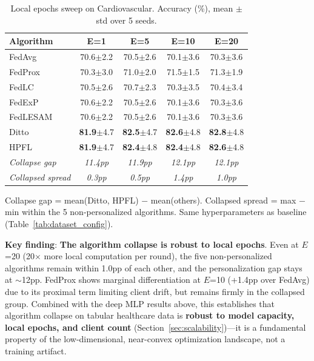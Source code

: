 \documentclass[conference,a4paper]{IEEEtran}
\begin{document}
\begin{table}[htbp]
\centering
\caption{Local epochs sweep on Cardiovascular. Accuracy (\%), mean $\pm$ std over 5 seeds.}
\label{tab:epochs_sweep}
\small
\begin{tabular}{lcccc}
\toprule
\textbf{Algorithm} & \textbf{E=1} & \textbf{E=5} & \textbf{E=10} & \textbf{E=20} \\
\midrule
FedAvg & 70.6{\tiny$\pm$2.2} & 70.5{\tiny$\pm$2.6} & 70.1{\tiny$\pm$3.6} & 70.3{\tiny$\pm$3.6} \\
FedProx & 70.3{\tiny$\pm$3.0} & 71.0{\tiny$\pm$2.0} & 71.5{\tiny$\pm$1.5} & 71.3{\tiny$\pm$1.9} \\
FedLC & 70.5{\tiny$\pm$2.6} & 70.7{\tiny$\pm$2.3} & 70.3{\tiny$\pm$3.5} & 70.4{\tiny$\pm$3.4} \\
FedExP & 70.6{\tiny$\pm$2.2} & 70.5{\tiny$\pm$2.6} & 70.1{\tiny$\pm$3.6} & 70.3{\tiny$\pm$3.6} \\
FedLESAM & 70.6{\tiny$\pm$2.2} & 70.5{\tiny$\pm$2.6} & 70.1{\tiny$\pm$3.6} & 70.3{\tiny$\pm$3.6} \\
\midrule
Ditto & \textbf{81.9}{\tiny$\pm$4.7} & \textbf{82.5}{\tiny$\pm$4.7} & \textbf{82.6}{\tiny$\pm$4.8} & \textbf{82.8}{\tiny$\pm$4.8} \\
HPFL & \textbf{81.9}{\tiny$\pm$4.7} & \textbf{82.4}{\tiny$\pm$4.8} & \textbf{82.4}{\tiny$\pm$4.8} & \textbf{82.6}{\tiny$\pm$4.8} \\
\midrule
\textit{Collapse gap} & \textit{11.4pp} & \textit{11.9pp} & \textit{12.1pp} & \textit{12.1pp} \\
\textit{Collapsed spread} & \textit{0.3pp} & \textit{0.5pp} & \textit{1.4pp} & \textit{1.0pp} \\
\bottomrule
\end{tabular}

\vspace{1mm}
\footnotesize{Collapse gap = mean(Ditto, HPFL) $-$ mean(others). Collapsed spread = max $-$ min within the 5 non-personalized algorithms. Same hyperparameters as baseline (Table~\ref{tab:dataset_config}).}
\end{table}

\textbf{Key finding}: \textbf{The algorithm collapse is robust to local epochs}. Even at $E$=20 (20$\times$ more local computation per round), the five non-personalized algorithms remain within 1.0pp of each other, and the personalization gap stays at $\sim$12pp. FedProx shows marginal differentiation at $E$=10 (+1.4pp over FedAvg) due to its proximal term limiting client drift, but remains firmly in the collapsed group. Combined with the deep MLP results above, this establishes that algorithm collapse on tabular healthcare data is \textbf{robust to model capacity, local epochs, and client count} (Section~\ref{sec:scalability})---it is a fundamental property of the low-dimensional, near-convex optimization landscape, not a training artifact.
\end{document}
